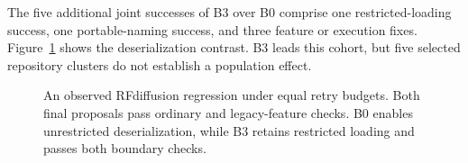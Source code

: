 The five additional joint successes of B3 over B0 comprise one restricted-loading success, one portable-naming success, and three feature or execution fixes. Figure~\ref{fig:bio-memory} shows the deserialization contrast. B3 leads this cohort, but five selected repository clusters do not establish a population effect.

\begin{figure}[t]
\centering

\caption{An observed RFdiffusion regression under equal retry budgets. Both final proposals pass ordinary and legacy-feature checks. B0 enables unrestricted deserialization, while B3 retains restricted loading and passes both boundary checks.}
\label{fig:bio-memory}
\end{figure}

